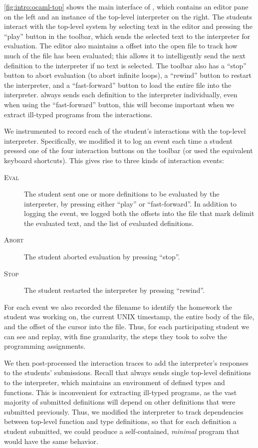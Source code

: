 \autoref{fig:intro:ocaml-top} shows the main interface of \ocamltop,
which contains an editor pane on the left and an instance of the \ocaml
top-level interpreter on the right.
%
The students interact with the top-level system by selecting text in the
editor and pressing the ``play'' button in the toolbar, which sends the
selected text to the interpreter for evaluation.
%
The editor also maintains a offset into the open file to track how much
of the file has been evaluated; this allows it to intelligently send the
next definition to the interpreter if no text is selected.
%
The toolbar also has a ``stop'' button to abort evaluation (\eg to abort
infinite loops), a ``rewind'' button to restart the interpreter, and a
``fast-forward'' button to load the entire file into the interpreter.
%
\ocamltop always sends each definition to the interpreter individually,
even when using the ``fast-forward'' button, this will become important
when we extract ill-typed programs from the interactions.

We instrumented \ocamltop to record each of the student's interactions
with the top-level interpreter.
%
Specifically, we modified it to log an event each time a student pressed
one of the four interaction buttons on the toolbar (or used the
equivalent keyboard shortcuts).
%
This gives rise to three kinds of interaction events:
%
\begin{description}
\item[\textsc{Eval}] The student sent one or more definitions to be
  evaluated by the interpreter, by pressing either ``play'' or
  ``fast-forward''. In addition to logging the event, we logged both the
  offsets into the file that mark delimit the evaluated text,
  and the list of evaluated definitions.
\item[\textsc{Abort}] The student aborted evaluation by pressing
  ``stop''.
\item[\textsc{Stop}] The student restarted the interpreter by pressing
  ``rewind''.
\end{description}
%
For each event we also recorded the filename to identify the homework
the student was working on, the current UNIX timestamp, the entire body
of the file, and the offset of the cursor into the file.
%
Thus, for each participating student we can see and replay, with fine
granularity, the steps they took to solve the programming assignments.

We then post-processed the interaction traces to add the \ocaml
interpreter's responses to the students' submissions.
%
Recall that \ocamltop always sends single top-level definitions to the
interpreter, which maintains an environment of defined types and
functions.
%
This is inconvenient for extracting ill-typed programs, as the vast
majority of submitted definitions will depend on other definitions
that were submitted previously.
%
Thus, we modified the \ocaml interpreter to track dependencies between
top-level function and type definitions, so that for each definition a
student submitted, we could produce a self-contained, \emph{minimal}
program that would have the same behavior.

